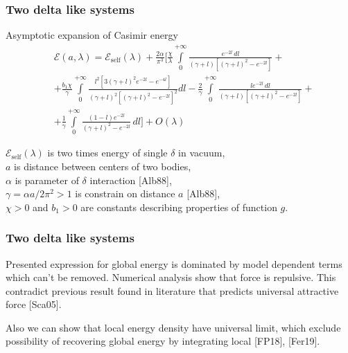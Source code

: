 \documentclass[10pt,t]{beamer}  %
\newcommand{\Ec}{\mathcal{E}}
\begin{document}
\begin{frame}
  \frametitle{Two delta like systems}


  Asymptotic expansion of Casimir energy
  \begin{equation}
    \label{eq:24}
    \begin{split}
      &\Ec( a, \lambda ) = \Ec_{ \textrm{self} }( \lambda ) + \frac{ 2
        \alpha }{ \pi^{ 3 } } \bigg[ \frac{ \chi }{ \lambda }
      \int\limits_{ 0 }^{ + \infty } \frac{ e^{ -2l } \, dl }{ (
        \gamma + l )
        [ ( \gamma + l )^{ 2 } - e^{ -2l } ] } + \\
      &+ \frac{ b_{ 1 } \chi }{ \gamma } \int\limits_{ 0 }^{ +\infty }
      \frac{ l^{ 2 } [ 3 ( \gamma + l )^{ 2 } e^{ -2l } - e^{ -4l } ]
      }{ ( \gamma + l )^{ 2 } [ ( \gamma + l )^{ 2 } - e^{ -2l } ]^{ 2
        } } dl - \frac{ 2 }{ \gamma } \int\limits_{ 0 }^{ +\infty }
      \frac{ l e^{ -2l } \, dl }{ ( \gamma + l ) [ ( \gamma + l )^{ 2
        } - e^{ -2l } ] }
      + \\
      &+ \frac{ 1 }{ \gamma } \int\limits_{ 0 }^{ +\infty } \frac{ ( 1
        - l ) e^{ -2l } } { ( \gamma + l )^{ 2 } - e^{ -2l } } \, dl
      \bigg] + O( \lambda )
    \end{split}
  \end{equation}

  \vspace{-2em}

  $\Ec_{ \textrm{self} }( \lambda )$ is two times energy of single $\delta$
  in vacuum, \\
  $a$ is distance between centers of two bodies, \\
  $\alpha$ is parameter of $\delta$ interaction [Alb88], \\
  $\gamma = \alpha a / 2 \pi^{ 2 } > 1$ is constrain on distance $a$
  [Alb88], \\
  $\chi > 0$ and $b_{ 1 } > 0$ are constants describing properties of
  function $g$.

\end{frame}





\begin{frame}
  \frametitle{Two delta like systems}


  Presented expression for global energy is dominated by model
  dependent terms which can't be removed. Numerical analysis show that
  force is repulsive. This contradict previous result found in
  literature that predicts universal attractive force [Sca05].

  Also we can show that local energy density have universal limit,
  which exclude possibility of recovering global energy by integrating
  local [FP18], [Fer19].

\end{frame}
\end{document}
